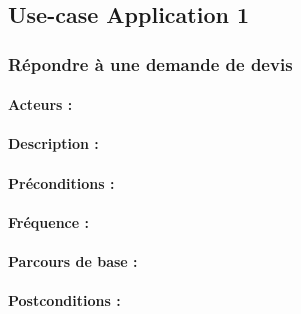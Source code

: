 \documentclass[../annexe.tex]{subfiles}
\begin{document}
\subsection{Use-case Application 1}	

		\subsubsection{Répondre à une demande de devis}
		\paragraph{Acteurs :}
		\paragraph{Description :}
		\paragraph{Préconditions :}
		\paragraph{Fréquence :}
		\paragraph{Parcours de base :}
		\begin{enumerate}
		\end{enumerate}
		\paragraph{Postconditions :}
\end{document}
